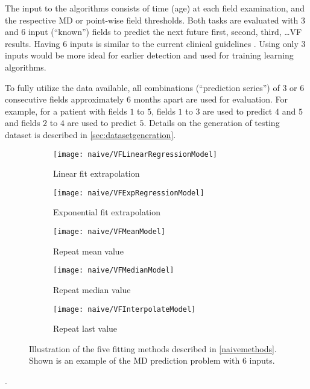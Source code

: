 The input to the algorithms consists of time (age) at each field examination, and the respective \ac{MD} or point-wise field thresholds. Both tasks are evaluated with $3$ and $6$ input (``known'') fields to predict the next future first, second, third, \dots \acl{VF} results. Having $6$ inputs is similar to the current clinical guidelines \cite{Chauhan2008}. Using only $3$ inputs would be more ideal for earlier detection and used for training learning algorithms. 

To fully utilize the data available, all combinations (``prediction series'') of $3$ or $6$ consecutive fields approximately $6$ months apart are used for evaluation. For example, for a patient with fields $1$ to $5$, fields $1$ to $3$ are used to predict $4$ and $5$ and fields $2$ to $4$ are used to predict $5$. Details on the generation of testing dataset is described in \cref{sec:datasetgeneration}.

\begin{figure}[p]
	\centering
	\begin{subfigure}[b]{0.49\textwidth}
		\centering
		\texttt{[image: naive/VFLinearRegressionModel]}
		\caption{Linear fit extrapolation}
	\end{subfigure}
	\hfill
	\begin{subfigure}[b]{0.49\textwidth}
		\centering
		\texttt{[image: naive/VFExpRegressionModel]}
		\caption{Exponential fit extrapolation}
	\end{subfigure}
	\hfill
	\begin{subfigure}[b]{0.49\textwidth}
		\centering
		\texttt{[image: naive/VFMeanModel]}
		\caption{Repeat mean value}
	\end{subfigure}
	\hfill
	\begin{subfigure}[b]{0.49\textwidth}
		\centering
		\texttt{[image: naive/VFMedianModel]}
		\caption{Repeat median value}
	\end{subfigure}
	\hfill
	\begin{subfigure}[b]{0.49\textwidth}
		\centering
		\texttt{[image: naive/VFInterpolateModel]}
		\caption{Repeat last value}
	\end{subfigure}
	\caption[Illustration of the five fitting methods]{Illustration of the five fitting methods described in \cref{naivemethods}. Shown is an example of the \ac{MD} prediction problem with 6 inputs.}
\end{figure}. 


